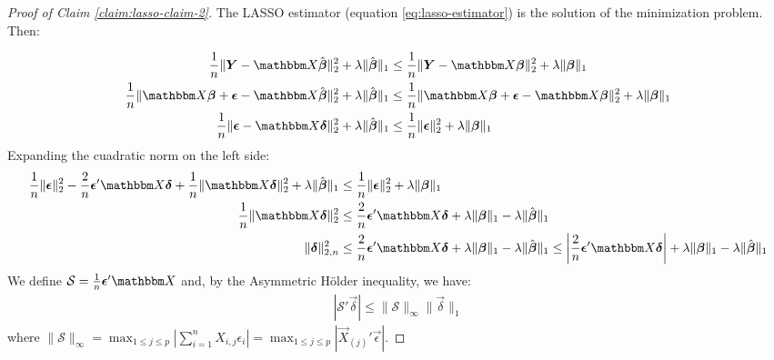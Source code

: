 \begin{proof}[Proof of Claim \ref{claim:lasso-claim-2}]
\label{proof:claim-lasso-claim-2}
The LASSO estimator (equation \ref{eq:lasso-estimator}) is the solution of the minimization problem. Then:

\begin{align*}
    \dfrac{1}{n} \|\Vec{Y} - \Mat{X} \hat{\Vec{\beta}}\|_{2}^{2} +
    \lambda \|\hat{\Vec{\beta}}\|_{1} 
    &\leq
    \dfrac{1}{n} \|\Vec{Y} - \Mat{X} \Vec{\beta}\|_{2}^{2} +
    \lambda \|\Vec{\beta}\|_{1}\\
    \dfrac{1}{n} \|\Mat{X}\Vec{\beta} + \Vec{\epsilon} - \Mat{X} \hat{\Vec{\beta}}\|_{2}^{2} +
    \lambda \|\hat{\Vec{\beta}}\|_{1} 
    &\leq
    \dfrac{1}{n} \|\Mat{X}\Vec{\beta} + \Vec{\epsilon} - \Mat{X} \Vec{\beta}\|_{2}^{2} +
    \lambda \|\Vec{\beta}\|_{1}\\
    \dfrac{1}{n} \|\Vec{\epsilon} - \Mat{X} \Vec{\delta} \|_{2}^{2} +
    \lambda \|\hat{\Vec{\beta}}\|_{1} 
    &\leq
    \dfrac{1}{n} \|\Vec{\epsilon}\|_{2}^{2} +
    \lambda \|\Vec{\beta}\|_{1}
\end{align*}
Expanding the cuadratic norm on the left side:
\begin{align*}
    \dfrac{1}{n} \|\Vec{\epsilon}\|_{2}^{2} - 
    \dfrac{2}{n} \Vec{\epsilon}' \Mat{X} \Vec{\delta} +
    \dfrac{1}{n} \|\Mat{X} \Vec{\delta}\|_{2}^{2} +
    \lambda \|\hat{\Vec{\beta}}\|_{1} 
    &\leq
    \dfrac{1}{n} \|\Vec{\epsilon}\|_{2}^{2} +
    \lambda \|\Vec{\beta}\|_{1}\\
    \dfrac{1}{n} \|\Mat{X} \Vec{\delta}\|_{2}^{2}
    &\leq
    \dfrac{2}{n} \Vec{\epsilon}' \Mat{X} \Vec{\delta} +
    \lambda \|\Vec{\beta}\|_{1} -
    \lambda \|\hat{\Vec{\beta}}\|_{1}\\
    \|\Vec{\delta}\|_{2, n}^{2}
    &\leq
    \dfrac{2}{n} \Vec{\epsilon}' \Mat{X} \Vec{\delta} +
    \lambda \|\Vec{\beta}\|_{1} -
    \lambda \|\hat{\Vec{\beta}}\|_{1}
    \leq
    \left|\dfrac{2}{n} \Vec{\epsilon}' \Mat{X} \Vec{\delta}\right| +
    \lambda \|\Vec{\beta}\|_{1} -
    \lambda \|\hat{\Vec{\beta}}\|_{1}
\end{align*} 
We define $\mathcal{S} = \frac{1}{n} \Vec{\epsilon}'\Mat{X}$ and, by the Asymmetric H\"older inequality, we have:
\begin{align*}
    |\mathcal{S}' \Vec{\delta}| \leq \|\mathcal{S}\|_{\infty} \|\Vec{\delta}\|_{1}
\end{align*}
where $\|\mathcal{S}\|_{\infty} = \max_{1 \leq j \leq p} \left| \sum_{i=1}^{n} X_{i,j} \epsilon_i \right| = \max_{1 \leq j \leq p} \left| \Vec{X}_{(j)}' \Vec{\epsilon} \right|$.


\end{proof}
